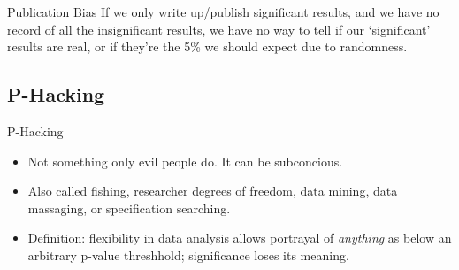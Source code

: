 \documentclass{beamer}
\begin{document}
\begin {frame}{Publication Bias}
If we only write up/publish significant results, and we have no record of all the insignificant results, we have no way to tell if our `significant' results are real, or if they're the 5\% we should expect due to randomness.
\end{frame}

\subsection{P-Hacking}
\begin{frame}{P-Hacking}
\begin{itemize}
\pause
\item
Not something only evil people do. It can be subconcious.
\item
Also called fishing, researcher degrees of freedom, data mining, data massaging, or specification searching.
\item
Definition: flexibility in data analysis allows portrayal of \textit{anything} as below an arbitrary p-value threshhold; significance loses its meaning.
\end{itemize}
\end{frame}
\end{document}
